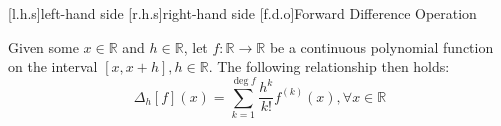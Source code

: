 [l.h.s]{left-hand side}
[r.h.s]{right-hand side}
[f.d.o]{Forward Difference Operation}

\begin{theorem}
  \label{thm:equality-thm}
  Given some $x\in\mathbb{R}$ and $h\in\mathbb{R}$, let $f:\mathbb{R}\to\mathbb{R}$ be a continuous polynomial function on the interval $\left[x, x+h\right],h\in\mathbb{R}$. The following relationship then holds:
  \begin{equation}
    \label{eq:equality-thm}
    \Delta_{h}\left[f\right]\left(x\right)=\sum_{k=1}^{\deg{f}}\frac{h^k}{k!}f^{\left(k\right)}\left(x\right),\forall{x}\in\mathbb{R}
  \end{equation}
\end{theorem}
